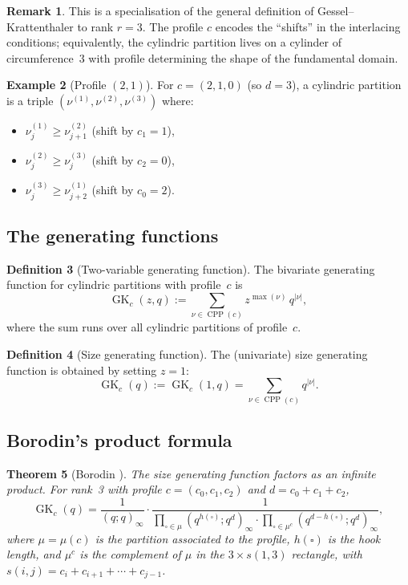 \documentclass[11pt]{article}
\theoremstyle{plain}
\newtheorem{theorem}{Theorem}
\theoremstyle{definition}
\newtheorem{definition}[theorem]{Definition}
\newtheorem{example}[theorem]{Example}
\newtheorem{remark}[theorem]{Remark}
\newcommand{\GK}{\operatorname{GK}}
\newcommand{\CPP}{\operatorname{CPP}}
\newcommand{\qpoch}[2]{(#1;#2)_\infty}
\begin{document}
\begin{remark}
This is a specialisation of the general definition of Gessel--Krattenthaler
\cite{GK} to rank $r = 3$.  The profile $c$ encodes the ``shifts'' in the
interlacing conditions; equivalently, the cylindric partition lives on a
cylinder of circumference~$3$ with profile determining the shape of the
fundamental domain.
\end{remark}

\begin{example}[Profile $(2, 1)$]
\label{ex:profile-21}
For $c = (2, 1, 0)$ (so $d = 3$), a cylindric partition is a triple
$(\nu^{(1)}, \nu^{(2)}, \nu^{(3)})$ where:
\begin{itemize}
  \item $\nu^{(1)}_j \geq \nu^{(2)}_{j+1}$ (shift by $c_1 = 1$),
  \item $\nu^{(2)}_j \geq \nu^{(3)}_j$ (shift by $c_2 = 0$),
  \item $\nu^{(3)}_j \geq \nu^{(1)}_{j+2}$ (shift by $c_0 = 2$).
\end{itemize}
\end{example}

\subsection{The generating functions}

\begin{definition}[Two-variable generating function]
\label{def:GK}
The bivariate generating function for cylindric partitions with profile~$c$ is
\begin{equation}
  \GK_c(z,q) := \sum_{\nu \in \CPP(c)} z^{\max(\nu)}\, q^{|\nu|},
  \label{eq:GK-def}
\end{equation}
where the sum runs over all cylindric partitions of profile~$c$.
\end{definition}

\begin{definition}[Size generating function]
\label{def:GK-size}
The (univariate) size generating function is obtained by setting $z = 1$:
\[
  \GK_c(q) := \GK_c(1,q) = \sum_{\nu \in \CPP(c)} q^{|\nu|}.
\]
\end{definition}

\subsection{Borodin's product formula}

\begin{theorem}[Borodin \cite{Borodin}]
\label{thm:borodin}
The size generating function factors as an infinite product.  For rank~3
with profile $c = (c_0, c_1, c_2)$ and $d = c_0 + c_1 + c_2$,
\[
  \GK_c(q) = \frac{1}{\qpoch{q}{q}} \cdot
  \frac{1}{\displaystyle\prod_{\square \in \mu} \qpoch{q^{h(\square)}}{q^d}
  \cdot \prod_{\square \in \mu^c} \qpoch{q^{d-h(\square)}}{q^d}},
\]
where $\mu = \mu(c)$ is the partition associated to the profile, $h(\square)$
is the hook length, and $\mu^c$ is the complement of $\mu$ in the
$3 \times s(1,3)$ rectangle, with $s(i,j) = c_i + c_{i+1} + \cdots + c_{j-1}$.
\end{theorem}
\end{document}
